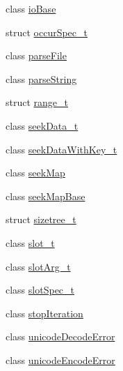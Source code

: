 \begin{DoxyCompactItemize}
class \mbox{\hyperlink{classebml_1_1ioBase}{io\+Base}}
\item 
struct \mbox{\hyperlink{structebml_1_1occurSpec__t}{occur\+Spec\+\_\+t}}
\item 
class \mbox{\hyperlink{classebml_1_1parseFile}{parse\+File}}
\item 
class \mbox{\hyperlink{classebml_1_1parseString}{parse\+String}}
\item 
struct \mbox{\hyperlink{structebml_1_1range__t}{range\+\_\+t}}
\item 
class \mbox{\hyperlink{classebml_1_1seekData__t}{seek\+Data\+\_\+t}}
\item 
class \mbox{\hyperlink{classebml_1_1seekDataWithKey__t}{seek\+Data\+With\+Key\+\_\+t}}
\item 
class \mbox{\hyperlink{classebml_1_1seekMap}{seek\+Map}}
\item 
class \mbox{\hyperlink{classebml_1_1seekMapBase}{seek\+Map\+Base}}
\item 
struct \mbox{\hyperlink{structebml_1_1sizetree__t}{sizetree\+\_\+t}}
\item 
class \mbox{\hyperlink{classebml_1_1slot__t}{slot\+\_\+t}}
\item 
class \mbox{\hyperlink{classebml_1_1slotArg__t}{slot\+Arg\+\_\+t}}
\item 
class \mbox{\hyperlink{classebml_1_1slotSpec__t}{slot\+Spec\+\_\+t}}
\item 
class \mbox{\hyperlink{classebml_1_1stopIteration}{stop\+Iteration}}
\item 
class \mbox{\hyperlink{classebml_1_1unicodeDecodeError}{unicode\+Decode\+Error}}
\item 
class \mbox{\hyperlink{classebml_1_1unicodeEncodeError}{unicode\+Encode\+Error}}
\end{DoxyCompactItemize}
